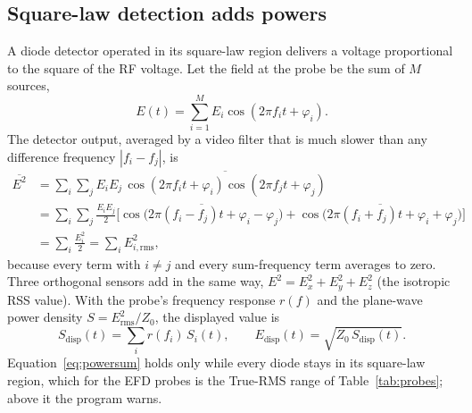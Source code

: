 \documentclass[10pt,letterpaper]{article}
\numberwithin{equation}{section}
\begin{document}
\subsection{Square-law detection adds powers}\label{sec:powersum}
A diode detector operated in its square-law region delivers a voltage
proportional to the square of the RF voltage. Let the field at the probe be the
sum of $M$ sources,
\begin{equation}
E(t) = \sum_{i=1}^{M} E_i \cos(2\pi f_i t + \varphi_i).
\end{equation}
The detector output, averaged by a video filter that is much slower than any
difference frequency $|f_i - f_j|$, is
\begin{align}
\overline{E^2} &= \sum_{i}\sum_{j} E_i E_j\,\overline{\cos(2\pi f_i t+\varphi_i)\cos(2\pi f_j t+\varphi_j)} \nonumber\\
&= \sum_{i}\sum_{j} \frac{E_i E_j}{2}\Big[\overline{\cos\big(2\pi(f_i-f_j)t+\varphi_i-\varphi_j\big)}
 + \overline{\cos\big(2\pi(f_i+f_j)t+\varphi_i+\varphi_j\big)}\Big] \nonumber\\
&= \sum_{i} \frac{E_i^2}{2} = \sum_i E_{i,\mathrm{rms}}^2,
\label{eq:powersum}
\end{align}
because every term with $i\neq j$ and every sum-frequency term averages to
zero. Three orthogonal sensors add in the same way,
$E^2 = E_x^2 + E_y^2 + E_z^2$ (the isotropic RSS value). With the probe's
frequency response $r(f)$ and the plane-wave power density
$S = E_\mathrm{rms}^2 / Z_0$, the displayed value is
\begin{equation}
S_\mathrm{disp}(t) = \sum_i r(f_i)\, S_i(t),\qquad
E_\mathrm{disp}(t) = \sqrt{Z_0\, S_\mathrm{disp}(t)}.
\label{eq:sdisp}
\end{equation}
Equation~\eqref{eq:powersum} holds only while every diode stays in its
square-law region, which for the EFD probes is the True-RMS range of
Table~\ref{tab:probes}; above it the program warns.
\end{document}
